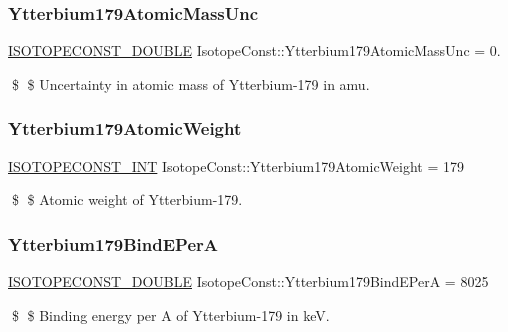 \subsubsection{\texorpdfstring{Ytterbium179\+Atomic\+Mass\+Unc}{Ytterbium179AtomicMassUnc}}
{\footnotesize\ttfamily \mbox{\hyperlink{group___isotope_const-_macros_ga8f45a7272ce02c0b4c65c44636ed719a}{I\+S\+O\+T\+O\+P\+E\+C\+O\+N\+S\+T\+\_\+\+D\+O\+U\+B\+LE}} Isotope\+Const\+::\+Ytterbium179\+Atomic\+Mass\+Unc = 0.}

\$ \$ Uncertainty in atomic mass of Ytterbium-\/179 in amu. \mbox{\label{group___isotope_const-_ytterbium-_yb179_ga5d5d0991e1e7b9649e84f35a49daf5c4}} 
\subsubsection{\texorpdfstring{Ytterbium179\+Atomic\+Weight}{Ytterbium179AtomicWeight}}
{\footnotesize\ttfamily \mbox{\hyperlink{group___isotope_const-_macros_ga5f18360b3e99483a35c32d789e62621c}{I\+S\+O\+T\+O\+P\+E\+C\+O\+N\+S\+T\+\_\+\+I\+NT}} Isotope\+Const\+::\+Ytterbium179\+Atomic\+Weight = 179}

\$ \$ Atomic weight of Ytterbium-\/179. \mbox{\label{group___isotope_const-_ytterbium-_yb179_ga25a012d96c0fc1e09ef3b5b56a71681d}} 
\subsubsection{\texorpdfstring{Ytterbium179\+Bind\+E\+PerA}{Ytterbium179BindEPerA}}
{\footnotesize\ttfamily \mbox{\hyperlink{group___isotope_const-_macros_ga8f45a7272ce02c0b4c65c44636ed719a}{I\+S\+O\+T\+O\+P\+E\+C\+O\+N\+S\+T\+\_\+\+D\+O\+U\+B\+LE}} Isotope\+Const\+::\+Ytterbium179\+Bind\+E\+PerA = 8025}

\$ \$ Binding energy per A of Ytterbium-\/179 in keV. \mbox{\label{group___isotope_const-_ytterbium-_yb179_gac0e5e1e4487bba2ee9f7fde03e9db4fa}} 
